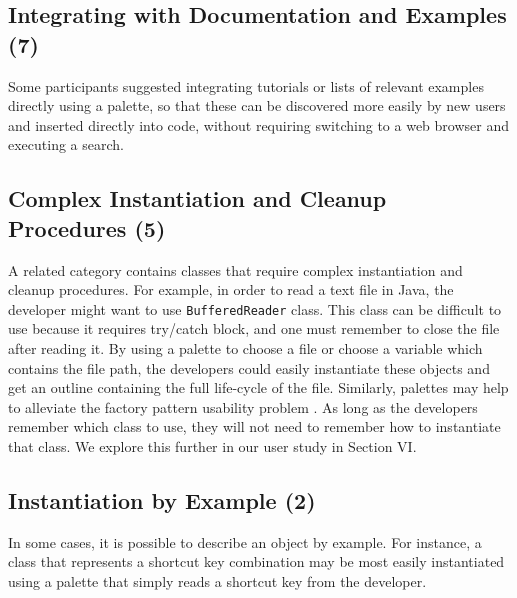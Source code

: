 \documentclass[10pt, conference, compsocconf]{IEEEtran}
\begin{document}
%	

\subsection{Integrating with Documentation and Examples (7)}
Some participants suggested integrating tutorials or lists of relevant examples directly using a palette, so that these can be discovered more easily by new users and inserted directly into code, without requiring switching to a web browser and executing a search.

\subsection{Complex Instantiation and Cleanup Procedures (5)}
A related category contains classes that require complex instantiation and cleanup procedures. For example, in order to read a text file in Java, the developer might want to use \texttt{BufferedReader} class. This class can be difficult to use because it requires try/catch block, and one must remember to close the file after reading it. By using a palette to choose a file or choose a variable which contains the file path, the developers could easily instantiate these objects and get an outline containing the full life-cycle of the file. Similarly, palettes may help to alleviate the factory pattern usability problem \cite{ellis_factory_2007}. As long as the developers remember which class to use, they will not need to remember how to instantiate that class. We explore this further in our user study in Section VI.


\subsection{Instantiation by Example (2)}
In some cases, it is possible to describe an object by example. For instance, a class that represents a shortcut key combination may be most easily instantiated using a palette that simply reads a shortcut key from the developer.
\end{document}
